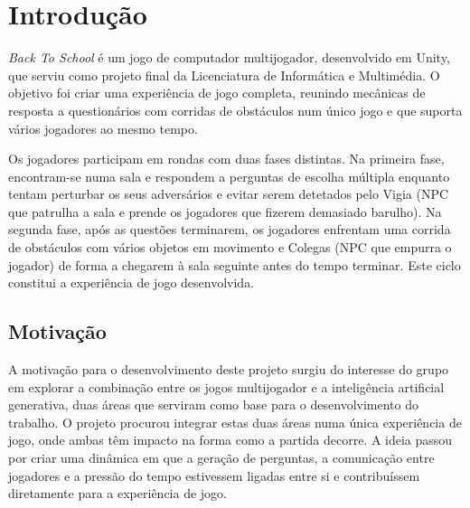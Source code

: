 



\chapter{Introdução}
\label{ch:introducao}

\textit{Back To School} é um jogo de computador multijogador, desenvolvido em Unity, que serviu como projeto final da Licenciatura de Informática e Multimédia. O objetivo foi criar uma experiência de jogo completa, reunindo mecânicas de resposta a questionários com corridas de obstáculos num único jogo e que suporta vários jogadores ao mesmo tempo.

Os jogadores participam em rondas com duas fases distintas. Na primeira fase, encontram-se numa sala e respondem a perguntas de escolha múltipla enquanto tentam perturbar os seus adversários e evitar serem detetados pelo Vigia (NPC que patrulha a sala e prende os jogadores que fizerem demasiado barulho). Na segunda fase, após as questões terminarem, os jogadores enfrentam uma corrida de obstáculos com vários objetos em movimento e Colegas (NPC que empurra o jogador) de forma a chegarem à sala seguinte antes do tempo terminar. Este ciclo constitui a experiência de jogo desenvolvida.


\section{Motivação}
\label{sec:motivacao}

A motivação para o desenvolvimento deste projeto surgiu do interesse do grupo em explorar a combinação entre os jogos multijogador e a inteligência artificial generativa, duas áreas que serviram como base para o desenvolvimento do trabalho. O projeto procurou integrar estas duas áreas numa única experiência de jogo, onde ambas têm impacto na forma como a partida decorre. A ideia passou por criar uma dinâmica em que a geração de perguntas, a comunicação entre jogadores e a pressão do tempo estivessem ligadas entre si e contribuíssem diretamente para a experiência de jogo.

